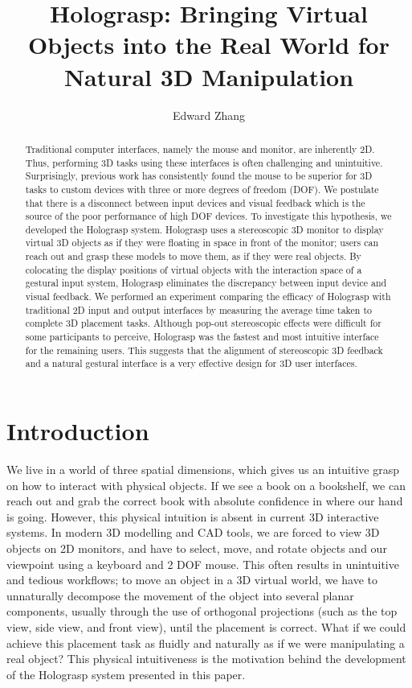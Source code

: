 \documentclass[pageno]{jpaper}
\begin{document}
\title{Holograsp: Bringing Virtual Objects into the Real World for Natural 3D Manipulation}

\date{}
\author{Edward Zhang}
\maketitle
\onehalfspace
\thispagestyle{empty}

\begin{abstract}
Traditional computer interfaces, namely the mouse and monitor, are inherently 2D. Thus, performing 3D tasks using
these interfaces is often challenging and unintuitive. Surprisingly,
previous work has consistently found the mouse to be superior for 3D tasks to custom devices with three or more degrees
of freedom (DOF). We postulate that there is a disconnect between input devices and visual feedback which is the
source of the poor performance of high DOF devices. To investigate this hypothesis, we developed the Holograsp
system. Holograsp uses a stereoscopic 3D monitor to display virtual 3D objects as if they were floating in
space in front of the monitor; users can reach out and grasp these models to move them, as if they were real
objects. By colocating the display positions of virtual objects with the interaction space of a gestural input system,
Holograsp eliminates the discrepancy between input device and visual feedback.
We performed an experiment comparing the efficacy of Holograsp with traditional 2D input and output
interfaces by measuring the average time taken to complete 3D placement tasks. Although 
pop-out stereoscopic effects were difficult for some participants to perceive, Holograsp was the fastest
and most intuitive interface for the remaining users. This suggests that the alignment of stereoscopic 3D
feedback and a natural gestural interface is a very effective design for 3D user interfaces.
\end{abstract}

\newpage
\tableofcontents
\newpage

\section{Introduction}
\label{sec:intro}
We live in a world of three spatial dimensions, which gives us an intuitive grasp on how to interact with
physical objects. If we see a book on a bookshelf, we can reach out and grab the correct book with
absolute confidence in where our hand is going. However, this physical intuition is absent in current 3D interactive
systems. In modern 3D modelling and CAD tools, we are forced to view 3D objects on 2D monitors, and have to
select, move, and rotate objects and our viewpoint using a keyboard and 2 DOF mouse. This often results in unintuitive and
tedious workflows; to move an object in a 3D virtual world, we have to unnaturally decompose the movement of the
object into several planar components, usually through the use of orthogonal projections (such as the top view, side view, and front view),
until the placement is correct.
What if we could achieve this placement task as fluidly and naturally as if we were manipulating a real object? This
physical intuitiveness is the motivation behind the development of the Holograsp system presented in this paper.
\end{document}
